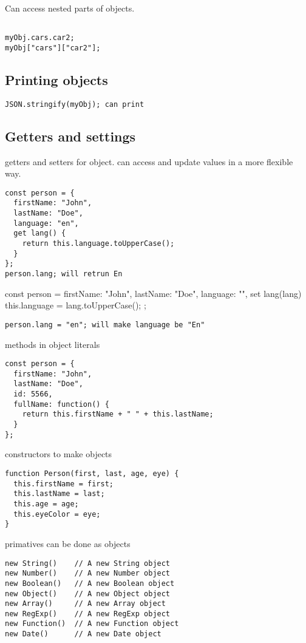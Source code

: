 Can access nested parts of objects.
\begin{verbatim}

myObj.cars.car2;
myObj["cars"]["car2"];
\end{verbatim}


\subsection{Printing objects}

\begin{verbatim}
JSON.stringify(myObj); can print
\end{verbatim}

\subsection{Getters and settings}

getters and setters for object. can access and update values in a more flexible way.

\begin{verbatim}
const person = {
  firstName: "John",
  lastName: "Doe",
  language: "en",
  get lang() {
    return this.language.toUpperCase();
  }
};
person.lang; will retrun En
\end{verbatim}

const person = {
  firstName: "John",
  lastName: "Doe",
  language: "",
  set lang(lang) {
    this.language = lang.toUpperCase();
  }
};
\begin{verbatim}
person.lang = "en"; will make language be "En"
\end{verbatim}

methods in object literals
\begin{verbatim}
const person = {
  firstName: "John",
  lastName: "Doe",
  id: 5566,
  fullName: function() {
    return this.firstName + " " + this.lastName;
  }
};
\end{verbatim}


constructors to make objects

\begin{verbatim}
function Person(first, last, age, eye) {
  this.firstName = first;
  this.lastName = last;
  this.age = age;
  this.eyeColor = eye;
}
\end{verbatim}

primatives can be done as objects
\begin{verbatim}
new String()    // A new String object
new Number()    // A new Number object
new Boolean()   // A new Boolean object
new Object()    // A new Object object
new Array()     // A new Array object
new RegExp()    // A new RegExp object
new Function()  // A new Function object
new Date()      // A new Date object 
\end{verbatim}

